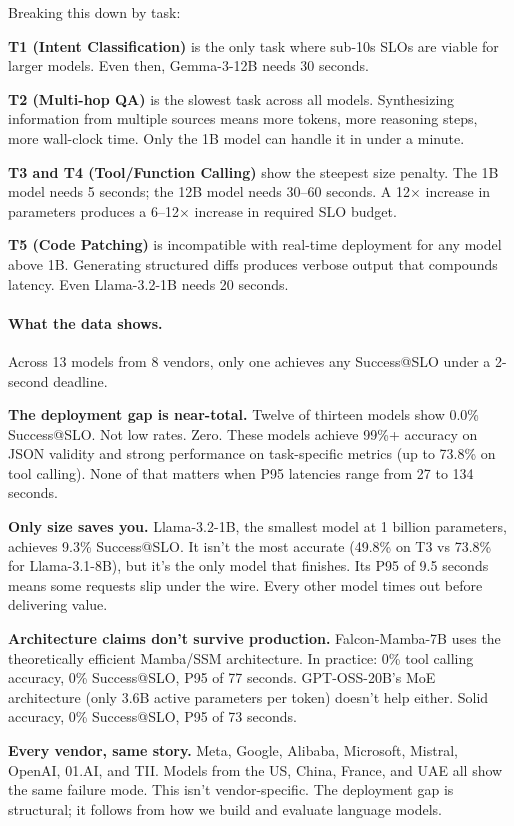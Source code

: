 \documentclass[11pt]{article}
\begin{document}
Breaking this down by task:

\textbf{T1 (Intent Classification)} is the only task where sub-10s SLOs are viable for larger models.  Even then, Gemma-3-12B needs 30 seconds.

\textbf{T2 (Multi-hop QA)} is the slowest task across all models.  Synthesizing information from multiple sources means more tokens, more reasoning steps, more wall-clock time.  Only the 1B model can handle it in under a minute.

\textbf{T3 and T4 (Tool/Function Calling)} show the steepest size penalty.  The 1B model needs 5 seconds; the 12B model needs 30--60 seconds.  A 12$\times$ increase in parameters produces a 6--12$\times$ increase in required SLO budget.

\textbf{T5 (Code Patching)} is incompatible with real-time deployment for any model above 1B.  Generating structured diffs produces verbose output that compounds latency.  Even Llama-3.2-1B needs 20 seconds.

\paragraph{What the data shows.}

Across 13 models from 8 vendors, only one achieves any Success@SLO under a 2-second deadline.

\textbf{The deployment gap is near-total.} Twelve of thirteen models show 0.0\% Success@SLO.  Not low rates.  Zero.  These models achieve 99\%+ accuracy on JSON validity and strong performance on task-specific metrics (up to 73.8\% on tool calling).  None of that matters when P95 latencies range from 27 to 134 seconds.

\textbf{Only size saves you.} Llama-3.2-1B, the smallest model at 1 billion parameters, achieves 9.3\% Success@SLO.  It isn't the most accurate (49.8\% on T3 vs 73.8\% for Llama-3.1-8B), but it's the only model that finishes.  Its P95 of 9.5 seconds means some requests slip under the wire.  Every other model times out before delivering value.

\textbf{Architecture claims don't survive production.} Falcon-Mamba-7B uses the theoretically efficient Mamba/SSM architecture.  In practice: 0\% tool calling accuracy, 0\% Success@SLO, P95 of 77 seconds.  GPT-OSS-20B's MoE architecture (only 3.6B active parameters per token) doesn't help either.  Solid accuracy, 0\% Success@SLO, P95 of 73 seconds.

\textbf{Every vendor, same story.} Meta, Google, Alibaba, Microsoft, Mistral, OpenAI, 01.AI, and TII.  Models from the US, China, France, and UAE all show the same failure mode.  This isn't vendor-specific.  The deployment gap is structural; it follows from how we build and evaluate language models.
\end{document}
